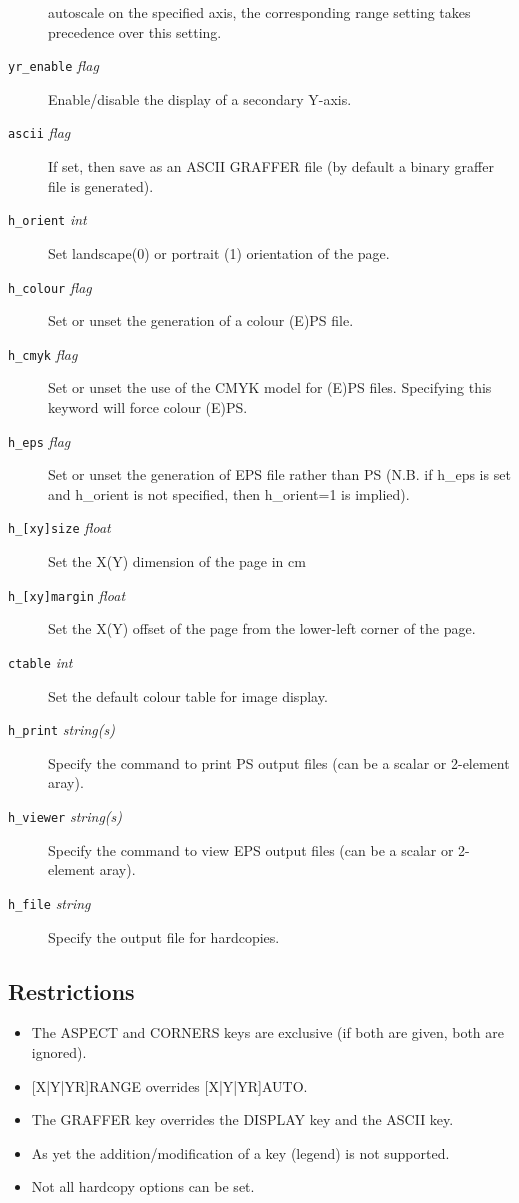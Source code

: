 \documentclass[11pt,twoside,english]{article}
\begin{document}
\begin{description}
  autoscale on the specified axis, the corresponding range setting
  takes precedence over this setting.
\item[\texttt{yr\_enable} \textit{flag}] Enable/disable the display of
  a secondary Y-axis.
\item[\texttt{ascii} \textit{flag}] If set, then save as an ASCII
  GRAFFER file (by default a binary graffer file is generated).
\item[\texttt{h\_orient} \textit{int}] Set landscape(0) or portrait (1)
  orientation of the page.
\item[\texttt{h\_colour} \textit{flag}] Set or unset the generation of
  a colour (E)PS file.
\item[\texttt{h\_cmyk} \textit{flag}] Set or unset the use of the CMYK
  model for (E)PS files. Specifying this keyword will force colour
  (E)PS.
\item[\texttt{h\_eps} \textit{flag}] Set or unset the generation of EPS
  file rather than PS (N.B. if h\_eps is set and h\_orient is not
  specified, then h\_orient=1 is implied).
\item[\texttt{h\_[xy]size} \textit{float}] Set the X(Y) dimension of
  the page in cm
\item[\texttt{h\_[xy]margin} \textit{float}] Set the X(Y) offset of the
  page from the lower-left corner of the page.
\item [\texttt{ctable} \textit{int}] Set the default colour table for
  image display.
\item[\texttt{h\_print} \textit{string(s)}] Specify the command to
  print PS output files (can be a scalar or 2-element aray).
\item[\texttt{h\_viewer} \textit{string(s)}] Specify the command to
  view EPS output files (can be a scalar or 2-element aray).
\item[\texttt{h\_file} \textit{string}] Specify the output file for
  hardcopies.
\end{description}



\subsection{Restrictions}
\label{sec:gp_restrict}

\begin{itemize}
\item The ASPECT and CORNERS keys are exclusive (if both are given,
  both are ignored).

\item {[X|Y|YR]}RANGE overrides {[X|Y|YR]}AUTO.

\item The GRAFFER key overrides the DISPLAY key and the ASCII key.

\item As yet the addition/modification of a key (legend) is not
  supported.

\item Not all hardcopy options can be set.

\end{itemize}
\end{document}
